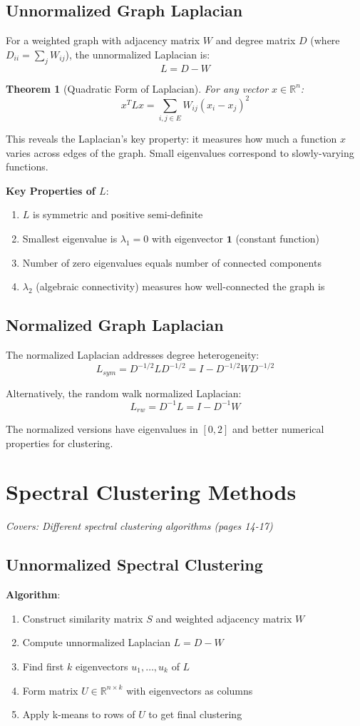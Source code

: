 \documentclass[11pt]{article}
\newtheorem{theorem}{Theorem}
\begin{document}
\subsection{Unnormalized Graph Laplacian}
For a weighted graph with adjacency matrix $W$ and degree matrix $D$ (where $D_{ii} = \sum_j W_{ij}$), the unnormalized Laplacian is:
$$L = D - W$$

\begin{theorem}[Quadratic Form of Laplacian]
For any vector $x \in \mathbb{R}^n$:
$$x^T L x = \sum_{i,j \in E} W_{ij}(x_i - x_j)^2$$
\end{theorem}

This reveals the Laplacian's key property: it measures how much a function $x$ varies across edges of the graph. Small eigenvalues correspond to slowly-varying functions.

\textbf{Key Properties of $L$}:
\begin{enumerate}
\item $L$ is symmetric and positive semi-definite
\item Smallest eigenvalue is $\lambda_1 = 0$ with eigenvector $\mathbf{1}$ (constant function)
\item Number of zero eigenvalues equals number of connected components
\item $\lambda_2$ (algebraic connectivity) measures how well-connected the graph is
\end{enumerate}

\subsection{Normalized Graph Laplacian}
The normalized Laplacian addresses degree heterogeneity:
$$L_{sym} = D^{-1/2}LD^{-1/2} = I - D^{-1/2}WD^{-1/2}$$

Alternatively, the random walk normalized Laplacian:
$$L_{rw} = D^{-1}L = I - D^{-1}W$$

The normalized versions have eigenvalues in $[0, 2]$ and better numerical properties for clustering.

\section{Spectral Clustering Methods}
\textit{Covers: Different spectral clustering algorithms (pages 14-17)}

\subsection{Unnormalized Spectral Clustering}
\textbf{Algorithm}:
\begin{enumerate}
\item Construct similarity matrix $S$ and weighted adjacency matrix $W$
\item Compute unnormalized Laplacian $L = D - W$
\item Find first $k$ eigenvectors $u_1, \ldots, u_k$ of $L$
\item Form matrix $U \in \mathbb{R}^{n \times k}$ with eigenvectors as columns
\item Apply k-means to rows of $U$ to get final clustering
\end{enumerate}
\end{document}
